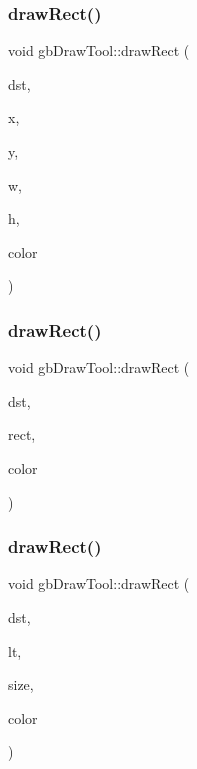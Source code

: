 \subsubsection{\texorpdfstring{drawRect()}{drawRect()}\hspace{0.1cm}{\footnotesize\ttfamily [1/3]}}
{\footnotesize\ttfamily void gb\+Draw\+Tool\+::draw\+Rect (\begin{DoxyParamCaption}\item[{S\+D\+L\+\_\+\+Texture $\ast$}]{dst,  }\item[{int}]{x,  }\item[{int}]{y,  }\item[{int}]{w,  }\item[{int}]{h,  }\item[{\mbox{\hyperlink{classgb_color}{gb\+Color}}}]{color }\end{DoxyParamCaption})}

\mbox{\label{classgb_draw_tool_af1e0a5cb5cd456e5179be2a32414b7b9}} 
\subsubsection{\texorpdfstring{drawRect()}{drawRect()}\hspace{0.1cm}{\footnotesize\ttfamily [2/3]}}
{\footnotesize\ttfamily void gb\+Draw\+Tool\+::draw\+Rect (\begin{DoxyParamCaption}\item[{S\+D\+L\+\_\+\+Texture $\ast$}]{dst,  }\item[{\mbox{\hyperlink{classgb_rect}{gb\+Rect}}}]{rect,  }\item[{\mbox{\hyperlink{classgb_color}{gb\+Color}}}]{color }\end{DoxyParamCaption})}

\mbox{\label{classgb_draw_tool_a54752a6e858627a3a50f4592f6e41863}} 
\subsubsection{\texorpdfstring{drawRect()}{drawRect()}\hspace{0.1cm}{\footnotesize\ttfamily [3/3]}}
{\footnotesize\ttfamily void gb\+Draw\+Tool\+::draw\+Rect (\begin{DoxyParamCaption}\item[{S\+D\+L\+\_\+\+Texture $\ast$}]{dst,  }\item[{\mbox{\hyperlink{classgb_point}{gb\+Point}}}]{lt,  }\item[{\mbox{\hyperlink{classgb_size}{gb\+Size}}}]{size,  }\item[{\mbox{\hyperlink{classgb_color}{gb\+Color}}}]{color }\end{DoxyParamCaption})}

